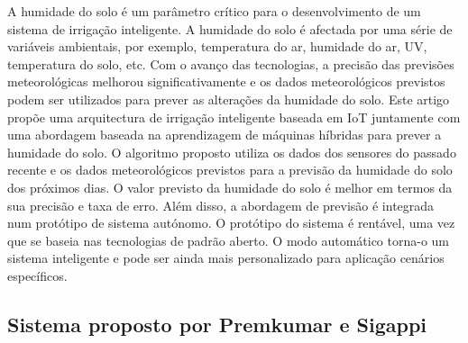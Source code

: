 \documentclass[conference]{IEEEtran}
\begin{document}
A humidade do solo é um parâmetro crítico para o desenvolvimento de um 
sistema de irrigação inteligente. A humidade do solo é afectada por uma 
série de variáveis ambientais, por exemplo, temperatura do ar, 
humidade do ar, UV, temperatura do solo, etc. Com o avanço das tecnologias, 
a precisão das previsões meteorológicas melhorou significativamente e 
os dados meteorológicos previstos podem ser utilizados para prever as 
alterações da humidade do solo. Este artigo propõe uma arquitectura 
de irrigação inteligente baseada em IoT juntamente com uma abordagem 
baseada na aprendizagem de máquinas híbridas para prever a humidade do solo. 
O algoritmo proposto utiliza os dados dos sensores do passado recente e 
os dados meteorológicos previstos para a previsão da humidade do solo 
dos próximos dias. O valor previsto da humidade do solo é melhor em 
termos da sua precisão e taxa de erro. Além disso, a abordagem de 
previsão é integrada num protótipo de sistema autónomo. O protótipo 
do sistema é rentável, uma vez que se baseia nas tecnologias de padrão aberto. 
O modo automático torna-o um sistema inteligente e pode ser ainda 
mais personalizado para aplicação cenários específicos. \cite{goap2018an}

\subsection{Sistema proposto por Premkumar e Sigappi}
\end{document}
